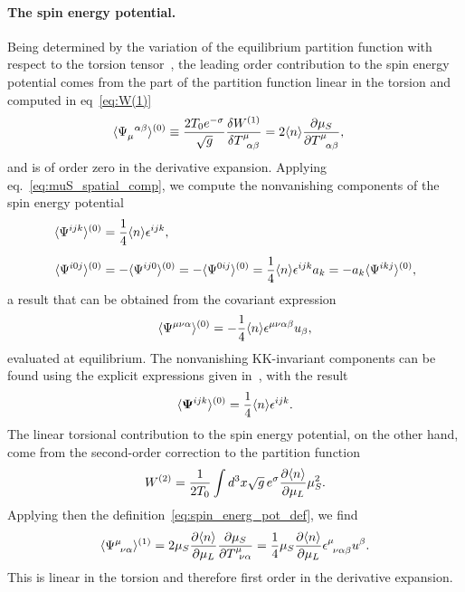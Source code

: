 \documentclass[11pt,a4paper]{article}
\begin{document}
\paragraph{The spin energy potential.}
Being determined by the variation of the equilibrium partition function
with respect to the torsion tensor~\cite{Hehl:1976kj,Manes:2020zdd}, the
leading order contribution to the spin energy potential comes from the part
of the partition function linear in the torsion and computed
in eq~\eqref{eq:W(1)}
\begin{align}
\langle \Psi_{\mu}^{\,\,\,\,\alpha\beta}\rangle^{(0)}
&\equiv{2T_{0}e^{-\sigma}\over \sqrt{g}}{\delta W^{(1)}\over \delta T^{\mu}_{\,\,\,\alpha\beta}}
=2\langle n\rangle {\partial\mu_{S}\over \partial T^{\mu}_{\,\,\,\,\alpha\beta}},
\label{eq:spin_energ_pot_def}
\end{align}
and is of order zero in the derivative expansion.
Applying eq.~\eqref{eq:muS_spatial_comp}, we compute the nonvanishing components 
of the spin energy potential
\begin{align}
\langle\Psi^{ijk}\rangle^{(0)}
&={1\over 4}\langle n\rangle \epsilon^{ijk}, \nonumber \\[0.2cm]
\langle\Psi^{i0j}\rangle^{(0)}
&=-\langle\Psi^{ij0}\rangle^{(0)}
=-\langle\Psi^{0ij}\rangle^{(0)}
={1\over 4}\langle n\rangle \epsilon^{ijk}a_{k}
=-a_{k}\langle\Psi^{ikj}\rangle^{(0)},
\end{align}
a result that can be obtained from the covariant expression
\begin{align}
\langle\Psi^{\mu\nu\alpha}\rangle^{(0)}
=-{1\over 4}\langle n\rangle\epsilon^{\mu\nu\alpha\beta}u_{\beta},
\label{eq:psi_gen_cov_expression}
\end{align}
evaluated at equilibrium.
The nonvanishing KK-invariant components can be found using the explicit expressions
given in~\cite{Manes:2020zdd}, with the result
\begin{align}
\langle\boldsymbol{\Psi}^{ijk}\rangle^{(0)}
={1\over 4}\langle n\rangle \epsilon^{ijk}.
\label{eq:spin_current_general}
\end{align} 
The linear torsional
contribution to the spin energy potential, on the other hand, come from the second-order correction
to the partition function
\begin{align}
W^{(2)}={1\over 2T_{0}}\int d^{3}x\sqrt{g}\,e^{\sigma}{\partial\langle n\rangle\over\partial\mu_{L}}
\mu_{S}^{2}.
\end{align}
Applying then the definition~\eqref{eq:spin_energ_pot_def}, we find
\begin{align}
\langle\Psi^{\mu}_{\,\,\,\nu\alpha}\rangle^{(1)}
=2\mu_{S}{\partial\langle n\rangle\over\partial\mu_{L}}
{\partial\mu_{S}\over \partial T^{\mu}_{\,\,\,\nu\alpha}}
={1\over 4}\mu_{S}{\partial\langle n\rangle\over\partial\mu_{L}}
\epsilon^{\mu}_{\,\,\,\nu\alpha\beta}u^{\beta}.
\label{eq:spin_energy_potlinT_gen}
\end{align}
This is linear in the torsion and therefore first order in the derivative expansion.
\end{document}
